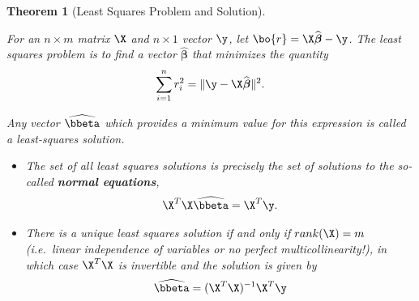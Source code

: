 \documentclass[
]{article}
\providecommand{\tightlist}{%
  \setlength{\itemsep}{0pt}\setlength{\parskip}{0pt}}
\newtheorem{theorem}{Theorem}[section]
\theoremstyle{definition}
\theoremstyle{definition}
\theoremstyle{definition}
\theoremstyle{definition}
\theoremstyle{remark}
\begin{document}
\begin{theorem}[Least Squares Problem and Solution]
\protect\hypertarget{thm:leastsquares}{}\label{thm:leastsquares}

For an \(n\times m\) matrix \(\X\) and \(n\times 1\) vector \(\y\), let \(\bo{r} = \X\widehat{\boldsymbol\beta} - \y\). The least squares problem is to find a vector \(\widehat{\boldsymbol\beta}\) that minimizes the quantity
\[\sum_{i=1}^n r_i^2 = \|\y-\X\widehat{\boldsymbol\beta} \|^2.\]

Any vector \(\widehat{\bbeta}\) which provides a minimum value for this expression is called a \emph{least-squares solution}.

\begin{itemize}
\tightlist
\item
  The set of all least squares solutions is precisely the set of solutions to the so-called \textbf{normal equations}, \[\X^T\X\widehat{\bbeta} = \X^T\y.\]
\item
  There is a unique least squares solution if and only if \(rank(\X)=m\) (i.e.~linear independence of variables or no perfect multicollinearity!), in which case \(\X^T\X\) is invertible and the solution is given by
  \[\widehat{\bbeta} = (\X^T\X)^{-1}\X^T\y\]
\end{itemize}

\end{theorem}
\end{document}
